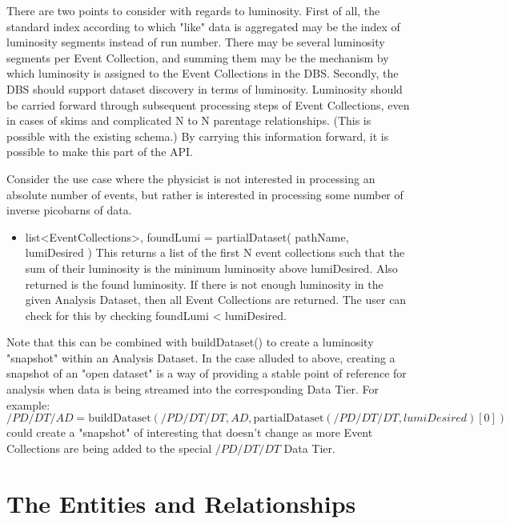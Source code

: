 \documentclass{cmspaper}
\begin{document}
  There are two points to consider with regards to luminosity.  First of all, the 
standard index according to which "like" data is aggregated may be the index of
luminosity segments instead of run number.  There may be several luminosity segments 
per Event Collection, and summing them may be the mechanism by which luminosity
is assigned to the Event Collections in the DBS.   Secondly, the DBS should support 
dataset discovery in terms of luminosity.  Luminosity should be carried forward 
through subsequent processing steps of Event Collections, even in cases of skims and 
complicated N to N parentage relationships.  (This is possible with the existing 
schema.)  By carrying this information forward, it is possible to make this part 
of the API.  

  Consider the use case where the physicist is not interested in processing an 
absolute number of events, but rather is interested in processing some number of
inverse picobarns of data.
\begin{itemize}
\item  list<EventCollections>, foundLumi = partialDataset( pathName, lumiDesired )
       This returns a list of the first N event collections such that the sum 
       of their luminosity is the minimum luminosity above lumiDesired.  Also 
       returned is the found luminosity.  If there is not enough luminosity in 
       the given Analysis Dataset, then all Event Collections are returned.  The 
       user can check for this by checking foundLumi < lumiDesired.
\end{itemize}

Note that this can be combined with buildDataset() to create a luminosity "snapshot" 
within an Analysis Dataset.  In the case alluded to above, creating a snapshot of an 
"open dataset" is a way of providing a stable point of reference for analysis when 
data is being streamed into the corresponding Data Tier. For example: 
\begin{equation}
   /PD/DT/AD = \mbox{buildDataset} ( /PD/DT/DT, AD, \mbox{partialDataset} ( /PD/DT/DT, lumiDesired )[0] )
\end{equation}
could create a "snapshot" of interesting that doesn't change as more Event Collections
are being added to the special $/PD/DT/DT$ Data Tier.


\section{The Entities and Relationships}
\label{sec:details}
\end{document}
